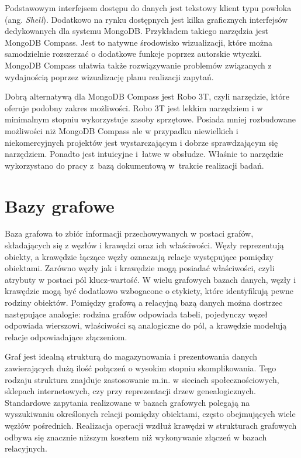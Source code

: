 \documentclass[a4paper,twoside,12pt]{book}
\newcommand{\obcy}[1]{\emph{#1}}
\newcommand{\ang}[1]{{\selectlanguage{british}\obcy{#1}}}
\begin{document}
Podstawowym interfejsem dostępu do danych jest tekstowy klient typu powłoka (ang. \ang{Shell}). Dodatkowo na rynku dostępnych jest kilka graficznych interfejsów dedykowanych dla systemu MongoDB. Przykładem takiego narzędzia jest MongoDB Compass. Jest to natywne środowisko wizualizacji, które można samodzielnie rozszerzać o dodatkowe funkcje poprzez autorskie wtyczki. MongoDB Compass ułatwia także rozwiązywanie problemów związanych z wydajnością poprzez wizualizację planu realizacji zapytań.

Dobrą alternatywą dla MongoDB Compass jest Robo 3T, czyli narzędzie, które oferuje podobny zakres możliwości. Robo 3T jest lekkim narzędziem i w minimalnym stopniu wykorzystuje zasoby sprzętowe. Posiada mniej rozbudowane możliwości niż MongoDB Compass ale w przypadku niewielkich i niekomercyjnych projektów jest wystarczającym i dobrze sprawdzającym się narzędziem. Ponadto jest intuicyjne i~łatwe w obsłudze. Właśnie to narzędzie wykorzystano do pracy z~bazą dokumentową w~trakcie realizacji badań.

\section{Bazy grafowe}

Baza grafowa to zbiór informacji przechowywanych w postaci grafów, składających się z węzłów i krawędzi oraz ich właściwości. Węzły reprezentują obiekty, a krawędzie łączące węzły oznaczają relacje występujące pomiędzy obiektami. Zarówno węzły jak i krawędzie mogą posiadać właściwości, czyli atrybuty w postaci pól klucz-wartość. W wielu grafowych bazach danych, węzły i krawędzie mogą być dodatkowo wzbogacone o etykiety, które identyfikują pewne rodziny obiektów. Pomiędzy grafową a relacyjną bazą danych można dostrzec następujące analogie: rodzina grafów odpowiada tabeli, pojedynczy węzeł odpowiada wierszowi, właściwości są analogiczne do pól, a krawędzie modelują relacje odpowiadające złączeniom.

Graf jest idealną strukturą do magazynowania i prezentowania danych zawierających dużą ilość połączeń o wysokim stopniu skomplikowania. Tego rodzaju struktura znajduje zastosowanie m.in. w sieciach społecznościowych, sklepach internetowych, czy przy reprezentacji drzew genealogicznych. Standardowe zapytania realizowane w bazach grafowych polegają na wyszukiwaniu określonych relacji pomiędzy obiektami, często obejmujących wiele węzłów pośrednich. Realizacja operacji wzdłuż krawędzi w strukturach grafowych odbywa się znacznie niższym kosztem niż wykonywanie złączeń w bazach relacyjnych. 
\end{document}
